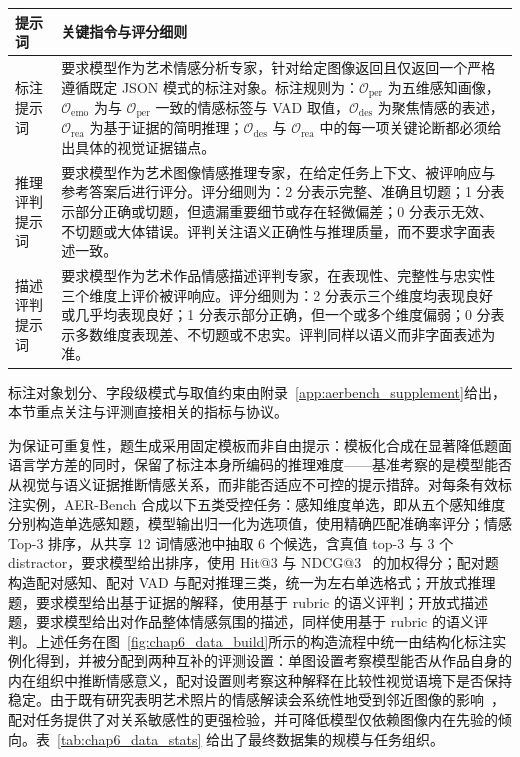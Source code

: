 \begin{table}[!htbp]
    \centering
    \vspace{0.5em}\centering\wuhao
    \setlength{\tabcolsep}{5pt}
    \renewcommand{\arraystretch}{1.15}
    \begin{tabularx}{\textwidth}{@{}>{\raggedright\arraybackslash}p{}>{\raggedright\arraybackslash}X@{}}
    \toprule
    提示词 & 关键指令与评分细则 \\
    \midrule
    标注提示词 & 要求模型作为艺术情感分析专家，针对给定图像返回且仅返回一个严格遵循既定 JSON 模式的标注对象。标注规则为：$\mathcal{O}_{\text{per}}$ 为五维感知画像，$\mathcal{O}_{\text{emo}}$ 为与 $\mathcal{O}_{\text{per}}$ 一致的情感标签与 VAD 取值，$\mathcal{O}_{\text{des}}$ 为聚焦情感的表述，$\mathcal{O}_{\text{rea}}$ 为基于证据的简明推理；$\mathcal{O}_{\text{des}}$ 与 $\mathcal{O}_{\text{rea}}$ 中的每一项关键论断都必须给出具体的视觉证据锚点。 \\
    \midrule
    推理评判提示词 & 要求模型作为艺术图像情感推理专家，在给定任务上下文、被评响应与参考答案后进行评分。评分细则为：2 分表示完整、准确且切题；1 分表示部分正确或切题，但遗漏重要细节或存在轻微偏差；0 分表示无效、不切题或大体错误。评判关注语义正确性与推理质量，而不要求字面表述一致。 \\
    \midrule
    描述评判提示词 & 要求模型作为艺术作品情感描述评判专家，在表现性、完整性与忠实性三个维度上评价被评响应。评分细则为：2 分表示三个维度均表现良好或几乎均表现良好；1 分表示部分正确，但一个或多个维度偏弱；0 分表示多数维度表现差、不切题或不忠实。评判同样以语义而非字面表述为准。 \\
    \bottomrule
    \end{tabularx}
\end{table}

标注对象划分、字段级模式与取值约束由附录~\ref{app:aerbench_supplement}给出，本节重点关注与评测直接相关的指标与协议。

为保证可重复性，题生成采用固定模板而非自由提示：模板化合成在显著降低题面语言学方差的同时，保留了标注本身所编码的推理难度——基准考察的是模型能否从视觉与语义证据推断情感关系，而非能否适应不可控的提示措辞。对每条有效标注实例，AER-Bench 合成以下五类受控任务：感知维度单选，即从五个感知维度分别构造单选感知题，模型输出归一化为选项值，使用精确匹配准确率评分；情感 Top-3 排序，从共享 12 词情感池中抽取 6 个候选，含真值 top-3 与 3 个 distractor，要求模型给出排序，使用 Hit@3 与 NDCG@3~\cite{NDCG} 的加权得分；配对题构造配对感知、配对 VAD 与配对推理三类，统一为左右单选格式；开放式推理题，要求模型给出基于证据的解释，使用基于 rubric 的语义评判；开放式描述题，要求模型给出对作品整体情感氛围的描述，同样使用基于 rubric 的语义评判。上述任务在图~\ref{fig:chap6_data_build}所示的构造流程中统一由结构化标注实例化得到，并被分配到两种互补的评测设置：单图设置考察模型能否从作品自身的内在组织中推断情感意义，配对设置则考察这种解释在比较性视觉语境下是否保持稳定。由于既有研究表明艺术照片的情感解读会系统性地受到邻近图像的影响~\cite{reymond2025pictorial}，配对任务提供了对关系敏感性的更强检验，并可降低模型仅依赖图像内在先验的倾向。表~\ref{tab:chap6_data_stats} 给出了最终数据集的规模与任务组织。

